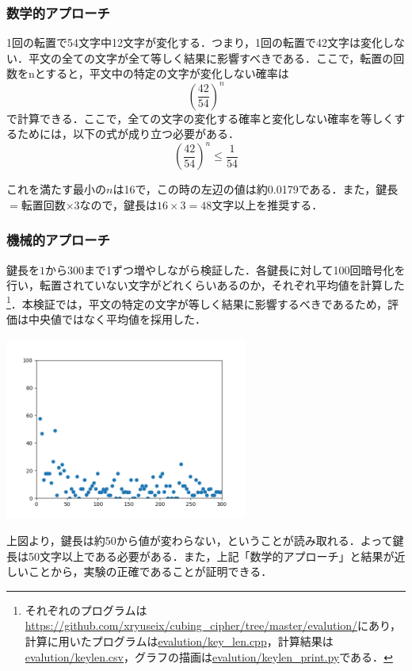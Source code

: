 \documentclass[titlepage]{jarticle}
\begin{document}
\subsubsection{数学的アプローチ}
1回の転置で54文字中12文字が変化する．つまり，1回の転置で42文字は変化しない．平文の全ての文字が全て等しく結果に影響すべきである．ここで，転置の回数をnとすると，平文中の特定の文字が変化しない確率は
\[\left(\frac{42}{54}\right)^n\]
で計算できる．ここで，全ての文字の変化する確率と変化しない確率を等しくするためには，以下の式が成り立つ必要がある．
\[\left(\frac{42}{54}\right)^n \leq \frac{1}{54}\]

これを満たす最小の\(n\)は16で，この時の左辺の値は約0.0179である．また，鍵長\(=\)転置回数\(\times 3\)なので，鍵長は\(16\times3=48\)文字以上を推奨する．

\subsubsection{機械的アプローチ}

鍵長を\(1\)から\(300\)まで1ずつ増やしながら検証した．各鍵長に対して100回暗号化を行い，転置されていない文字がどれくらいあるのか，それぞれ平均値を計算した\footnote{それぞれのプログラムは\url{https://github.com/xryuseix/cubing_cipher/tree/master/evalution/}にあり，計算に用いたプログラムは\url{evalution/key\_len.cpp}，計算結果は\url{evalution/keylen.csv}，グラフの描画は\url{evalution/keylen\_print.py}である．}．本検証では，平文の特定の文字が等しく結果に影響するべきであるため，評価は中央値ではなく平均値を採用した．\\
\begin{center}
  \includegraphics[width=8cm]{./tex_pic/figure.png}\\
\end{center}
上図より，鍵長は約50から値が変わらない，ということが読み取れる．よって鍵長は50文字以上である必要がある．また，上記「数学的アプローチ」と結果が近しいことから，実験の正確であることが証明できる．
\end{document}

